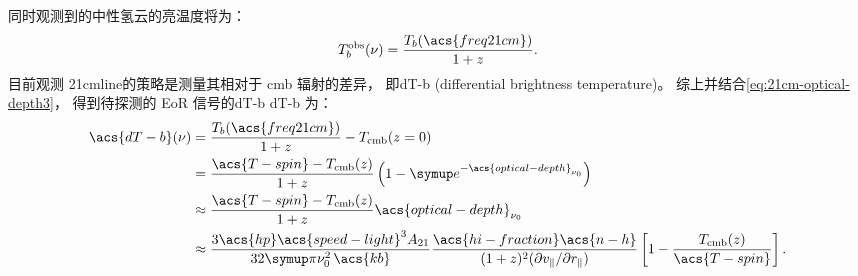 同时观测到的中性氢云的亮温度将为：
\begin{equation}
  T_b^{\R{obs}}(\nu) = \frac{T_b(\acs{freq21cm})}{1 + z} .
\end{equation}
目前观测 \ac{21cmline}的策略是测量其相对于 \ac{cmb} 辐射的差异，
即\acl{dT-b} (differential brightness temperature)。
综上并结合\autoref{eq:21cm-optical-depth3}，
得到待探测的 EoR 信号的\acl{dT-b} \ac{dT-b} 为：
\begin{align}
  \acs{dT-b}(\nu)
    & = \frac{T_b(\acs{freq21cm})}{1 + z} - T_{\R{cmb}}(z=0)  \\
    & = \frac{\acs{T-spin} - T_{\R{cmb}}(z)}{1+z}
      \left( 1 - \Ce^{-\acs{optical-depth}_{\nu_0}} \right)  \\
    & \approx \frac{\acs{T-spin} - T_{\R{cmb}}(z)}{1+z}
      \acs{optical-depth}_{\nu_0}  \\
    & \approx \frac{3 \acs{hp} \acs{speed-light}^3 A_{21}}{
      32\Cpi \nu_0^2 \,\acs{kb}}
      \frac{\acs{hi-fraction} \acs{n-h}}{
        (1+z)^2 (\partial v_{\parallel} / \partial r_{\parallel})}
      \left[ 1 - \frac{T_{\R{cmb}}(z)}{\acs{T-spin}} \right] .
    \label{eq:eor-signal1}
\end{align}

